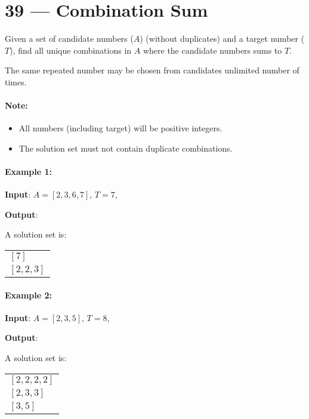 \section{39 --- Combination Sum}
Given a set of candidate numbers ($A$) (without duplicates) and a target number ($T$), find all unique combinations in $A$ where the candidate numbers sums to $T$.

The same repeated number may be chosen from candidates unlimited number of times.

\paragraph{Note:}

\begin{itemize}
\item All numbers (including target) will be positive integers.
\item The solution set must not contain duplicate combinations.
\end{itemize}

\paragraph{Example 1:}

\begin{flushleft}
\textbf{Input}: $A = [2,3,6,7]$, $T = 7$,

\textbf{Output}:

A solution set is:

\begin{table}[H]
\begin{tabular}{l}
$[7]$ \\
$[2,2,3]$
\end{tabular}
\end{table}

\end{flushleft}

\paragraph{Example 2:}

\begin{flushleft}
\textbf{Input}: $A = [2,3,5]$, $T = 8$,

\textbf{Output}:

A solution set is:

\begin{table}[H]
\begin{tabular}{l}
$[2,2,2,2]$ \\
$[2,3,3]$ \\
$[3,5]$
\end{tabular}
\end{table}
\end{flushleft}


